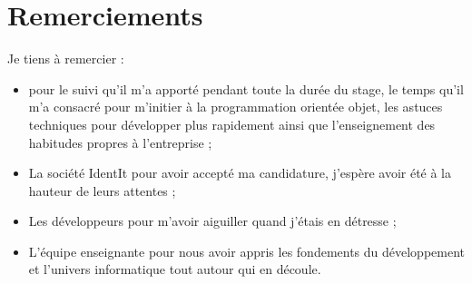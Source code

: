 \chapter*{Remerciements} %
\label{cha:Remerciements}

Je tiens à remercier :
\begin{itemize}
\item {} pour le suivi qu'il m'a apporté pendant toute la durée du
stage, le temps qu'il m'a consacré pour m'initier à la programmation orientée
objet, les astuces techniques pour développer plus rapidement ainsi que
l'enseignement des habitudes propres à l'entreprise ;
\item La société IdentIt pour avoir accepté ma candidature, j'espère avoir
été à la hauteur de leurs attentes ;
\item Les développeurs pour m'avoir aiguiller quand j'étais en détresse ;
\item L'équipe enseignante pour nous avoir appris les fondements du
développement et l'univers informatique tout autour qui en découle.
\end{itemize}
